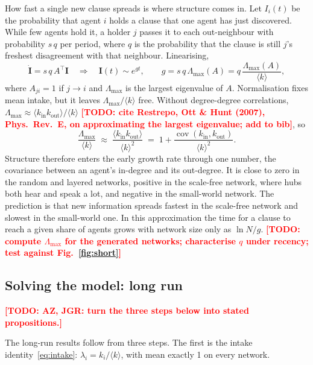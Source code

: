 \documentclass[11pt]{article}
\newcommand{\todo}[1]{\textcolor{red}{\textbf{[TODO: #1]}}}
\begin{document}
How fast a single new clause spreads is where structure comes in. Let $I_i(t)$ be the probability that agent $i$ holds a clause that one agent has just discovered. While few agents hold it, a holder $j$ passes it to each out-neighbour with probability $s\,q$ per period, where $q$ is the probability that the clause is still $j$'s freshest disagreement with that neighbour. Linearising,
\[
\dot{\mathbf{I}} = s\,q\,A^{\top}\mathbf{I}
\quad\Longrightarrow\quad
\mathbf{I}(t) \sim e^{g t},
\qquad
g = s\,q\,\Lambda_{\max}(A) = q\,\frac{\Lambda_{\max}(A)}{\langle k\rangle},
\]
where $A_{ji} = 1$ if $j \to i$ and $\Lambda_{\max}$ is the largest eigenvalue of $A$. Normalisation fixes mean intake, but it leaves $\Lambda_{\max}/\langle k\rangle$ free. Without degree-degree correlations, $\Lambda_{\max} \approx \langle k_{\mathrm{in}} k_{\mathrm{out}}\rangle / \langle k\rangle$ \todo{cite Restrepo, Ott \& Hunt (2007), Phys.\ Rev.\ E, on approximating the largest eigenvalue; add to bib}, so
\[
\frac{\Lambda_{\max}}{\langle k\rangle} \;\approx\; \frac{\langle k_{\mathrm{in}} k_{\mathrm{out}}\rangle}{\langle k\rangle^{2}} \;=\; 1 + \frac{\operatorname{cov}(k_{\mathrm{in}}, k_{\mathrm{out}})}{\langle k\rangle^{2}}.
\]
Structure therefore enters the early growth rate through one number, the covariance between an agent's in-degree and its out-degree. It is close to zero in the random and layered networks, positive in the scale-free network, where hubs both hear and speak a lot, and negative in the small-world network. The prediction is that new information spreads fastest in the scale-free network and slowest in the small-world one. In this approximation the time for a clause to reach a given share of agents grows with network size only as $\ln N / g$. \todo{compute $\Lambda_{\max}$ for the generated networks; characterise $q$ under recency; test against Fig.~\ref{fig:short}}

\subsection{Solving the model: long run}

\todo{AZ, JGR: turn the three steps below into stated propositions.}

The long-run results follow from three steps. The first is the intake identity~\eqref{eq:intake}: $\lambda_i = k_i/\langle k\rangle$, with mean exactly 1 on every network.
\end{document}
